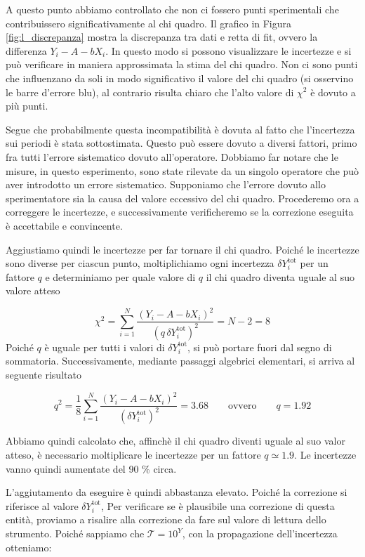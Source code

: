 A questo punto abbiamo controllato che non ci fossero punti sperimentali che contribuissero significativamente
al chi quadro. Il grafico in Figura \ref{fig:l_discrepanza} mostra la discrepanza tra dati e retta di fit,
ovvero la differenza $Y_i - A - bX_i$. In questo modo si possono visualizzare le incertezze e si può verificare
in maniera approssimata la stima del chi quadro. Non ci sono punti che influenzano da soli in modo significativo
il valore del chi quadro (si osservino le barre d'errore blu), al contrario risulta chiaro che l'alto valore di $\chi^2$
è dovuto a più punti.

Segue che probabilmente questa incompatibilità è dovuta al fatto che l'incertezza sui periodi è stata sottostimata.
Questo può essere dovuto a diversi fattori, primo fra tutti l'errore sistematico dovuto all'operatore. Dobbiamo
far notare che le misure, in questo esperimento, sono state rilevate da un singolo operatore che può aver introdotto
un errore sistematico. Supponiamo che
l'errore dovuto allo sperimentatore sia la causa del valore eccessivo del chi quadro. Procederemo ora a correggere le incertezze,
e successivamente verificheremo se la correzione eseguita è accettabile e convincente.

Aggiustiamo quindi le incertezze per far tornare il chi quadro.  Poiché le incertezze sono diverse per ciascun punto,
moltiplichiamo ogni incertezza $\delta Y_i^{\text{tot}}$ per un fattore $q$ e determiniamo per quale valore di $q$
il chi quadro diventa uguale al suo valore atteso

\begin{equation}
    \chi^2 = \sum_{i=1}^N \frac{(Y_i - A - bX_i)^2}{(q\, \delta Y_i^{\text{tot}})^2} = N - 2 = 8
\end{equation}
%
Poiché $q$ è uguale per tutti i valori di $\delta Y_i^{\text{tot}}$, si può portare fuori dal segno di sommatoria.
Successivamente, mediante passaggi algebrici elementari, si arriva al seguente risultato

\begin{equation}
    q^2 = \frac{1}{8} \sum_{i=1}^N \frac{(Y_i - A - bX_i)^2}{(\delta Y_i^{\text{tot}})^2} = 3.68 \qquad \text{ovvero} \qquad q = 1.92
\end{equation}

Abbiamo quindi calcolato che, affinchè il chi quadro diventi uguale al suo valor atteso, è necessario moltiplicare
le incertezze per un fattore $q \simeq 1.9$. Le incertezze vanno quindi aumentate del 90 \% circa.

L'aggiutamento da eseguire è quindi abbastanza elevato. Poiché la correzione si riferisce al valore $\delta Y_i^{\text{tot}}$,
Per verificare se è plausibile una correzione di questa entità, proviamo a risalire alla correzione da fare sul valore di lettura
dello strumento.
Poiché sappiamo che $\mathcal{T} = 10^Y$, con la propagazione dell'incertezza otteniamo:

